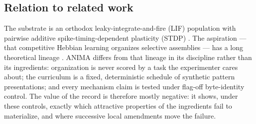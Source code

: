 \subsection{Relation to related work}

The substrate is an orthodox leaky-integrate-and-fire (LIF) population
with pairwise additive spike-timing-dependent plasticity (STDP)
\cite{gerstner2002,bipoo1998}. The aspiration --- that competitive
Hebbian learning organizes selective assemblies --- has a long
theoretical lineage \cite{hebb1949,song2000}. ANIMA differs from that
lineage in its discipline rather than its ingredients: organization is
never scored by a task the experimenter cares about; the curriculum is
a fixed, deterministic schedule of synthetic pattern presentations; and
every mechanism claim is tested under flag-off byte-identity control.
The value of the record is therefore mostly negative: it shows, under
these controls, exactly which attractive properties of the ingredients
fail to materialize, and where successive local amendments move the
failure.